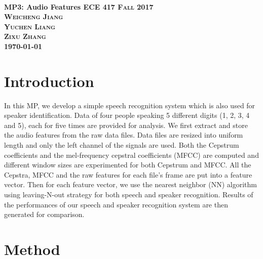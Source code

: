 \documentclass{article}
\begin{document}
	\everymath{\displaystyle}
	\begin{titlepage}	 	
		\center
		\text{}\\[3cm]
		\linespread{2}\huge \bfseries MP3: Audio Features
		\center\textsc{\Large ECE 417 Fall 2017}\\[1cm]
		\Large\center\textsc{Weicheng Jiang \\Yuchen Liang\\ Zixu Zhang  }\\[1.4cm]
		\Large \today\\
		\vfill
	\end{titlepage}
	\setlength{\baselineskip}{24pt}
	
	\section{Introduction}
	In this MP, we develop a simple speech recognition system which is also used for speaker identification. Data of four people speaking 5 different digits (1, 2, 3, 4 and 5), each for five times are provided for analysis. We first extract and store the audio features from the raw data files. Data files are resized into uniform length and only the left channel of the signals are used. Both the Cepstrum coefficients and the mel-frequency cepstral coefficients (MFCC) are computed and different window sizes are experimented for both Cepstrum and MFCC. All the Cepstra, MFCC and the raw features for each file’s frame are put into a feature vector. Then for each feature vector, we use the nearest neighbor (NN) algorithm using leaving-N-out strategy for both speech and speaker recognition. Results of the performances of our speech and speaker recognition system are then generated for comparison. 

	\section{Method}
\end{document}
